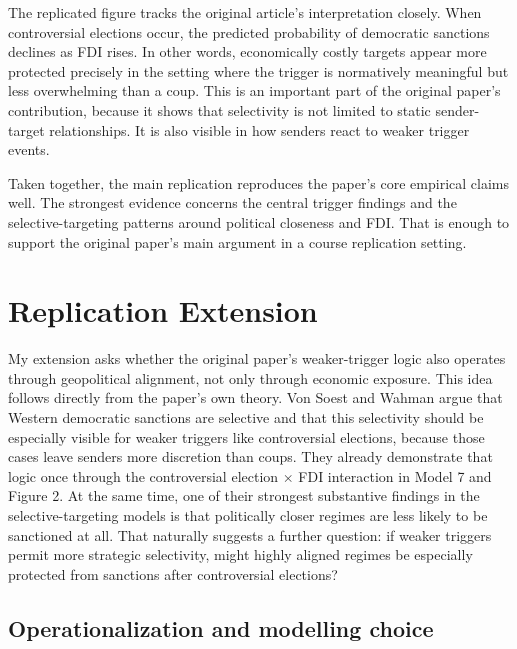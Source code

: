 \documentclass[12pt,letterpaper]{article}
\begin{document}
	The replicated figure tracks the original article's interpretation closely. When controversial elections occur, the predicted probability of democratic sanctions declines as FDI rises. In other words, economically costly targets appear more protected precisely in the setting where the trigger is normatively meaningful but less overwhelming than a coup. This is an important part of the original paper's contribution, because it shows that selectivity is not limited to static sender-target relationships. It is also visible in how senders react to weaker trigger events.
	
	Taken together, the main replication reproduces the paper's core empirical claims well. The strongest evidence concerns the central trigger findings and the selective-targeting patterns around political closeness and FDI. That is enough to support the original paper's main argument in a course replication setting.
	
	\FloatBarrier
	
	\section{Replication Extension}
	
	
	My extension asks whether the original paper's weaker-trigger logic also operates through geopolitical alignment, not only through economic exposure. This idea follows directly from the paper's own theory. Von Soest and Wahman argue that Western democratic sanctions are selective and that this selectivity should be especially visible for weaker triggers like controversial elections, because those cases leave senders more discretion than coups. They already demonstrate that logic once through the controversial election $\times$ FDI interaction in Model 7 and Figure 2. At the same time, one of their strongest substantive findings in the selective-targeting models is that politically closer regimes are less likely to be sanctioned at all. That naturally suggests a further question: if weaker triggers permit more strategic selectivity, might highly aligned regimes be especially protected from sanctions after controversial elections?

	
	\subsection*{Operationalization and modelling choice}
	
\end{document}

